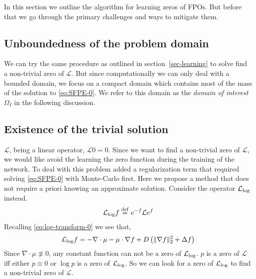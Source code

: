 In this section we outline the algorithm for learning zeros of FPOs. But before that we go through the primary challenges and ways to mitigate them.

\subsection{Unboundedness of the problem domain}\label{ssec-unbounded-domain} We can try the same procedure as outlined in section~\ref{sec-learning} to solve find a non-trivial zero of $\mathcal L$. But since computationally we can only deal with a bounded domain, we focus on a compact domain which contains most of the mass of the solution to \eqref{eq:SFPE-0}. We refer to this domain as the \textit{domain of interest} $\Omega_I$ in the following discussion. 


\subsection{Existence of the trivial solution}\label{ssec-exist-0} $\mathcal L$, being  a linear operator, $\mathcal L0=0$. Since we want to find a non-trivial zero of $\mathcal L$, we would like avoid the learning the zero function during the training of the network. To deal with this problem \cite{zhai2022deep} added a regularization term that required solving \eqref{eq:SFPE-0} with Monte-Carlo first. Here we propose a method that does not require a priori knowing an approximate solution. Consider the operator $\mathcal L_{\rm log}$ instead.
\begin{align}
    \mathcal L_{\rm log}f \stackrel{\rm def}{=} e^{-f}\mathcal L e^f\label{eq:def-log-FPO}
\end{align}
Recalling \eqref{eq:log-transform-0} we see that,
\begin{align}
    \mathcal L_{\rm log}f=
    -\nabla\cdot \mu - \mu \cdot \nabla f + D\left(\|\nabla f\|_2^2 + \Delta f\right)\label{eq:log-FPO}
\end{align}
Since $\nabla\cdot\mu\not\equiv0$, any constant function can not be a zero of $\mathcal L_{\rm log}$. $p$ is a zero of $\mathcal L$ iff either $p\equiv0$ or $\log p$ is a zero of $\mathcal L_{\rm log}$. So we can look for a zero of $\mathcal L_{\rm log}$ to find a non-trivial zero of $\mathcal L$.

